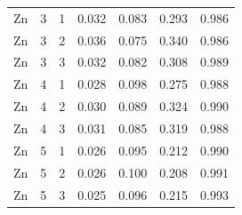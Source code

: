 \documentclass[ms, hidelinks]{uncgdissertationexp}
\theoremstyle{plain}
\theoremstyle{definition}
\theoremstyle{remark}
\begin{document}
\begin{longtable}{ccccccc}
Zn & 3 & 1 & 0.032 & 0.083 & 0.293 & 0.986\\
\rowcolor{gray!6}  Zn & 3 & 2 & 0.036 & 0.075 & 0.340 & 0.986\\
Zn & 3 & 3 & 0.032 & 0.082 & 0.308 & 0.989\\
\rowcolor{gray!6}  Zn & 4 & 1 & 0.028 & 0.098 & 0.275 & 0.988\\
Zn & 4 & 2 & 0.030 & 0.089 & 0.324 & 0.990\\
\rowcolor{gray!6}  Zn & 4 & 3 & 0.031 & 0.085 & 0.319 & 0.988\\
Zn & 5 & 1 & 0.026 & 0.095 & 0.212 & 0.990\\
\rowcolor{gray!6}  Zn & 5 & 2 & 0.026 & 0.100 & 0.208 & 0.991\\
Zn & 5 & 3 & 0.025 & 0.096 & 0.215 & 0.993\\*
\end{longtable}
\clearpage
\end{document}

